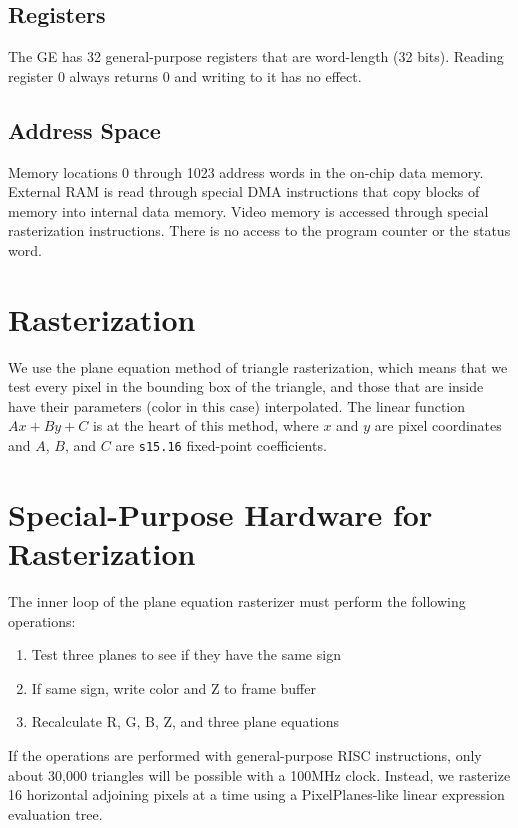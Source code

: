 \documentclass{article}
\begin{document}
\subsection{Registers}

The GE has 32 general-purpose registers that are word-length (32 bits).
Reading register 0 always returns 0 and writing to it has no effect.

\subsection{Address Space}

Memory locations 0 through 1023 address words in the on-chip data memory.
External RAM is read through special DMA instructions that copy blocks
of memory into internal data memory.  Video memory is accessed through
special rasterization instructions.
There is no access to the program counter or the status word.

\section{Rasterization}

We use the plane equation method of triangle rasterization, which means
that we test every pixel in the bounding box of the triangle, and
those that are inside have their parameters (color in this case)
interpolated.  The linear function $Ax + By + C$ is at the heart of
this method, where $x$ and $y$ are pixel coordinates and $A$, $B$, and $C$
are {\tt s15.16} fixed-point coefficients.

\section{Special-Purpose Hardware for Rasterization}

The inner loop of the plane equation rasterizer must perform the following
operations:

\begin{enumerate}
\item Test three planes to see if they have the same sign
\item If same sign, write color and Z to frame buffer
\item Recalculate R, G, B, Z, and three plane equations
\end{enumerate}

If the operations are performed with general-purpose RISC instructions,
only about 30,000 triangles will be possible with a 100MHz clock.
Instead, we rasterize 16 horizontal adjoining pixels at a time
using a PixelPlanes-like linear expression evaluation tree.
\end{document}
